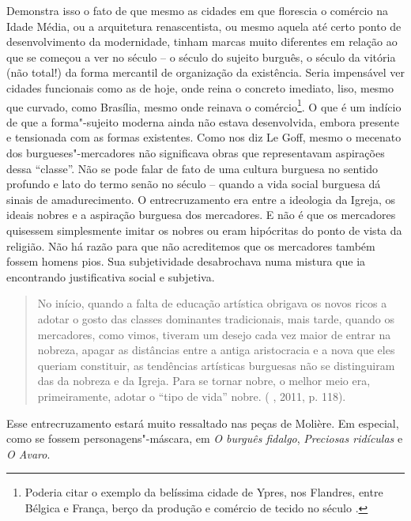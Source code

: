 Demonstra isso o fato de que mesmo as cidades em que florescia o
comércio na Idade Média, ou a arquitetura renascentista, ou mesmo aquela
até certo ponto de desenvolvimento da modernidade, tinham marcas muito
diferentes em relação ao que se começou a ver no século  -- o século
do sujeito burguês, o século da vitória (não total!) da forma mercantil
de organização da existência. Seria impensável ver cidades funcionais
como as de hoje, onde reina o concreto imediato, liso, mesmo que
curvado, como Brasília, mesmo onde reinava o comércio\footnote{Poderia
  citar o exemplo da belíssima cidade de Ypres, nos Flandres, entre
  Bélgica e França, berço da produção e comércio de tecido no século
  .}. O que é um indício de que a forma"-sujeito moderna ainda não
estava desenvolvida, embora presente e tensionada com as formas
existentes. Como nos diz Le Goff, mesmo o mecenato dos
burgueses"-mercadores não significava obras que representavam aspirações
dessa ``classe''. Não se pode falar de fato de uma cultura burguesa no
sentido profundo e lato do termo senão no século  -- quando a vida
social burguesa dá sinais de amadurecimento. O entrecruzamento era entre
a ideologia da Igreja, os ideais nobres e a aspiração burguesa dos
mercadores. E não é que os mercadores quisessem simplesmente imitar os
nobres ou eram hipócritas do ponto de vista da religião. Não há razão
para que não acreditemos que os mercadores também fossem homens pios.
Sua subjetividade desabrochava numa mistura que ia encontrando
justificativa social e subjetiva.

\begin{quote}
No início, quando a falta de educação artística obrigava os novos ricos
a adotar o gosto das classes dominantes tradicionais, mais tarde, quando
os mercadores, como vimos, tiveram um desejo cada vez maior de entrar na
nobreza, apagar as distâncias entre a antiga aristocracia e a nova que
eles queriam constituir, as tendências artísticas burguesas não se
distinguiram das da nobreza e da Igreja. Para se tornar nobre, o melhor
meio era, primeiramente, adotar o ``tipo de vida'' nobre. ( ,
2011, p. 118).
\end{quote}

Esse entrecruzamento estará muito ressaltado nas peças de Molière. Em
especial, como se fossem personagens"-máscara, em \emph{O burguês
fidalgo}, \emph{Preciosas ridículas} e \emph{O Avaro}.


